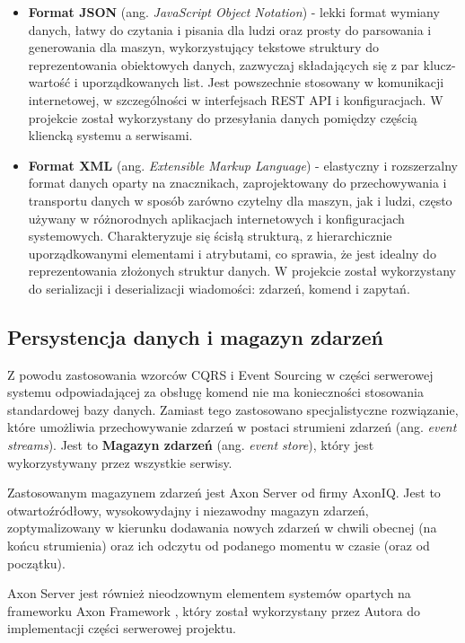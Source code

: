 \begin{itemize}
    \item \textbf{Format JSON} \cite{json} (ang. \textit{JavaScript Object Notation}) - lekki format wymiany danych, łatwy do czytania i pisania dla ludzi oraz prosty do parsowania i generowania dla maszyn, wykorzystujący tekstowe struktury do reprezentowania obiektowych danych, zazwyczaj składających się z par klucz-wartość i uporządkowanych list. Jest powszechnie stosowany w komunikacji internetowej, w szczególności w interfejsach REST API i konfiguracjach. W projekcie został wykorzystany do przesyłania danych pomiędzy częścią kliencką systemu a serwisami.
    
    \item \textbf{Format XML} (ang. \textit{Extensible Markup Language}) - elastyczny i rozszerzalny format danych oparty na znacznikach, zaprojektowany do przechowywania i transportu danych w sposób zarówno czytelny dla maszyn, jak i ludzi, często używany w różnorodnych aplikacjach internetowych i konfiguracjach systemowych. Charakteryzuje się ścisłą strukturą, z hierarchicznie uporządkowanymi elementami i atrybutami, co sprawia, że jest idealny do reprezentowania złożonych struktur danych. W projekcie został wykorzystany do serializacji i deserializacji wiadomości: zdarzeń, komend i zapytań.

\end{itemize}

\subsection{Persystencja danych i magazyn zdarzeń}

Z powodu zastosowania wzorców CQRS i Event Sourcing w części serwerowej systemu odpowiadającej za obsługę komend nie ma konieczności stosowania standardowej bazy danych. Zamiast tego zastosowano specjalistyczne rozwiązanie, które umożliwia przechowywanie zdarzeń w postaci strumieni zdarzeń (ang. \textit{event streams}). Jest to \textbf{Magazyn zdarzeń} (ang. \textit{event store}), który jest wykorzystywany przez wszystkie serwisy.

Zastosowanym magazynem zdarzeń jest Axon Server od firmy AxonIQ. Jest to otwartoźródłowy, wysokowydajny i niezawodny magazyn zdarzeń, zoptymalizowany w kierunku dodawania nowych zdarzeń w chwili obecnej (na końcu strumienia) oraz ich odczytu od podanego momentu w czasie (oraz od początku).

Axon Server jest również nieodzownym elementem systemów opartych na frameworku Axon Framework \cite{axonframework}, który został wykorzystany przez Autora do implementacji części serwerowej projektu.

